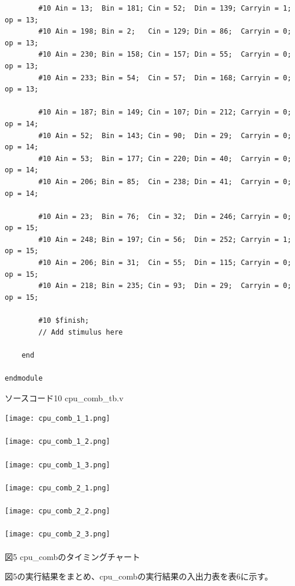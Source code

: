 \documentclass[12pt]{jreport}
\begin{document}
\begin{center}
\begin{lstlisting}
        #10 Ain = 13;  Bin = 181; Cin = 52;  Din = 139; Carryin = 1; op = 13;
        #10 Ain = 198; Bin = 2;   Cin = 129; Din = 86;  Carryin = 0; op = 13;
        #10 Ain = 230; Bin = 158; Cin = 157; Din = 55;  Carryin = 0; op = 13;
        #10 Ain = 233; Bin = 54;  Cin = 57;  Din = 168; Carryin = 0; op = 13;
  
        #10 Ain = 187; Bin = 149; Cin = 107; Din = 212; Carryin = 0; op = 14;
        #10 Ain = 52;  Bin = 143; Cin = 90;  Din = 29;  Carryin = 0; op = 14;
        #10 Ain = 53;  Bin = 177; Cin = 220; Din = 40;  Carryin = 0; op = 14;
        #10 Ain = 206; Bin = 85;  Cin = 238; Din = 41;  Carryin = 0; op = 14;

        #10 Ain = 23;  Bin = 76;  Cin = 32;  Din = 246; Carryin = 0; op = 15;
        #10 Ain = 248; Bin = 197; Cin = 56;  Din = 252; Carryin = 1; op = 15;
        #10 Ain = 206; Bin = 31;  Cin = 55;  Din = 115; Carryin = 0; op = 15;
        #10 Ain = 218; Bin = 235; Cin = 93;  Din = 29;  Carryin = 0; op = 15;
        
        #10 $finish;
        // Add stimulus here

    end
      
endmodule
            \end{lstlisting}
            ソースコード10 cpu\_comb\_tb.v
        \end{center}

        \begin{center}
            \texttt{[image: cpu\_comb\_1\_1.png]} \\　\\
            \texttt{[image: cpu\_comb\_1\_2.png]} \\　\\
            \texttt{[image: cpu\_comb\_1\_3.png]} \\　\\

            \texttt{[image: cpu\_comb\_2\_1.png]} \\　\\
            \texttt{[image: cpu\_comb\_2\_2.png]} \\　\\
            \texttt{[image: cpu\_comb\_2\_3.png]} \\　\\
                図5 cpu_combのタイミングチャート
        \end{center}

        図5の実行結果をまとめ、cpu_combの実行結果の入出力表を表6に示す。
\end{document}
